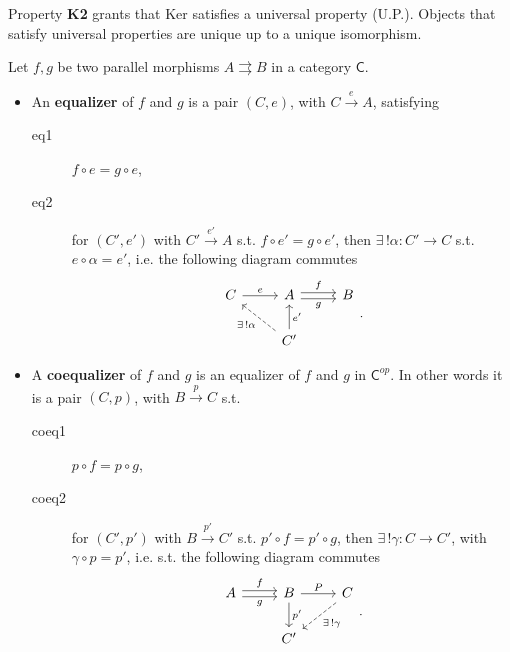 \begin{rem}
	Property \textbf{K2} grants that Ker satisfies a universal property (U.P.).
	Objects that satisfy universal properties are unique up to a unique isomorphism. 
\end{rem}

\begin{defn}[(Co)equalizer]
	Let $f,g$ be two parallel morphisms $A \rightrightarrows B$ in a category $\mathsf{C}$.
	\begin{itemize}
		\item An \textbf{equalizer} of $f$ and $g$ is a pair $\left(C, e\right)$, with $C \xrightarrow{e} A$, satisfying
	\begin{description}
		\item[eq1] $f \circ e = g \circ e$,
		\item[eq2] for $\left(C', e'\right)$ with $C' \xrightarrow{e'} A$ s.t. $f \circ e' = g \circ e'$, then
			$\exists\, ! \alpha: C' \to C$ s.t. $e \circ \alpha = e'$, i.e. the following diagram commutes
			\begin{equation}
			\begin{tikzcd}
				C \arrow[r, "e", rightarrow] & A \arrow[r, "f", rightarrow, shift left=.5ex] \arrow[r, "g"', rightarrow, shift right=.5ex] & B\\
				    & C' \arrow[lu, "\exists\, ! \alpha", dashrightarrow] \arrow[u, "e'"', rightarrow] & 
			\end{tikzcd}
			.\end{equation} 
	\end{description}
	\item A \textbf{coequalizer} of $f$ and $g$ is an equalizer of $f$ and $g$ in $\mathsf{C}^{op}$.
		In other words it is a pair $\left(C, p\right)$, with $B \xrightarrow{p} C$ s.t.
		\begin{description}
			\item[coeq1] $p \circ f = p \circ g$,
			\item[coeq2] for $\left(C', p'\right)$ with $B \xrightarrow{p'} C'$ s.t. $p' \circ f = p' \circ g$, then $\exists\, ! \gamma: C \to C'$, with $\gamma \circ p = p'$, i.e. s.t. the following diagram commutes
			\begin{equation}
			\begin{tikzcd}
				A \arrow[r, "f", rightarrow, shift left=.5ex] \arrow[r, "g"', rightarrow, shift right=.5ex] & B \arrow[r, "P", rightarrow] \arrow[d, "p'", rightarrow] & C \arrow[dl, "\exists\, ! \gamma", dashrightarrow] \\
				    & C' & 
			\end{tikzcd}
			.\end{equation} 
		\end{description} 
	\end{itemize}
\end{defn}

